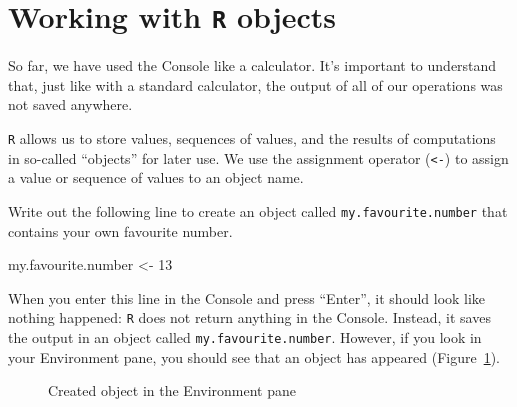 \documentclass[
  letterpaper,
  DIV=11,
  numbers=noendperiod,
  oneside]{scrreprt}
\newenvironment{Shaded}{\begin{snugshade}}{\end{snugshade}}
\newcommand{\DecValTok}[1]{\textcolor[rgb]{0.68,0.00,0.00}{#1}}
\newcommand{\NormalTok}[1]{\textcolor[rgb]{0.00,0.23,0.31}{#1}}
\newcommand{\OtherTok}[1]{\textcolor[rgb]{0.00,0.23,0.31}{#1}}
\begin{document}
\section{\texorpdfstring{Working with \texttt{R}
objects}{Working with R objects}}\label{working-with-r-objects}

So far, we have used the Console like a calculator. It's important to
understand that, just like with a standard calculator, the output of all
of our operations was not saved anywhere.

\texttt{R} allows us to store values, sequences of values, and the
results of computations in so-called ``objects'' for later use. We use
the assignment operator (\texttt{\textless{}-}) to assign a value or
sequence of values to an object name.

Write out the following line to create an object called
\texttt{my.favourite.number} that contains your own favourite number.

\begin{Shaded}
\begin{Highlighting}[]
\NormalTok{my.favourite.number }\OtherTok{\textless{}{-}} \DecValTok{13}
\end{Highlighting}
\end{Shaded}

When you enter this line in the Console and press ``Enter'', it should
look like nothing happened: \texttt{R} does not return anything in the
Console. Instead, it saves the output in an object called
\texttt{my.favourite.number}. However, if you look in your Environment
pane, you should see that an object has appeared
(Figure~\ref{fig-ObjectCreation}).

\begin{figure}


\caption{\label{fig-ObjectCreation}Created object in the Environment
pane}

\end{figure}%
\end{document}
